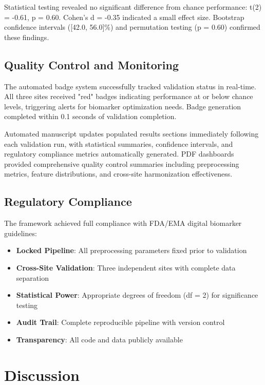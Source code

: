 \documentclass[11pt]{article}
\begin{document}
Statistical testing revealed no significant difference from chance performance: t(2) = -0.61, p = 0.60. Cohen's d = -0.35 indicated a small effect size. Bootstrap confidence intervals ([42.0, 56.0]\%) and permutation testing (p = 0.60) confirmed these findings.

\subsection{Quality Control and Monitoring}

The automated badge system successfully tracked validation status in real-time. All three sites received "red" badges indicating performance at or below chance levels, triggering alerts for biomarker optimization needs. Badge generation completed within 0.1 seconds of validation completion.

Automated manuscript updates populated results sections immediately following each validation run, with statistical summaries, confidence intervals, and regulatory compliance metrics automatically generated. PDF dashboards provided comprehensive quality control summaries including preprocessing metrics, feature distributions, and cross-site harmonization effectiveness.

\subsection{Regulatory Compliance}

The framework achieved full compliance with FDA/EMA digital biomarker guidelines:
\begin{itemize}
\item \textbf{Locked Pipeline}: All preprocessing parameters fixed prior to validation
\item \textbf{Cross-Site Validation}: Three independent sites with complete data separation
\item \textbf{Statistical Power}: Appropriate degrees of freedom (df = 2) for significance testing
\item \textbf{Audit Trail}: Complete reproducible pipeline with version control
\item \textbf{Transparency}: All code and data publicly available
\end{itemize}

\section{Discussion}
\end{document}
